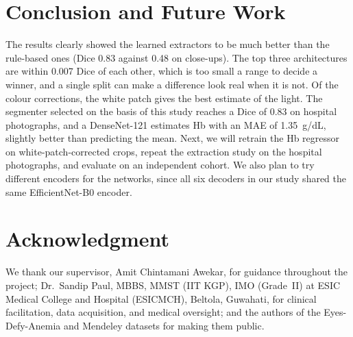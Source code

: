 \documentclass[conference]{IEEEtran}
\begin{document}
\section{Conclusion and Future Work}
The results clearly showed the learned extractors to be much better than the
rule-based ones (Dice 0.83 against 0.48 on close-ups). The top three
architectures are within 0.007 Dice of each other, which is too small a range to
decide a winner, and a single split can make a difference look real when it is
not. Of the colour corrections, the white patch gives the best estimate of the
light. The segmenter selected on the basis of this study reaches a Dice of 0.83
on hospital photographs, and a DenseNet-121 estimates Hb with an MAE of
1.35~g/dL, slightly better than predicting the mean. Next, we will retrain the
Hb regressor on white-patch-corrected crops, repeat the extraction study on the
hospital photographs, and evaluate on an independent cohort. We also plan to
try different encoders for the networks, since all six decoders in our study
shared the same EfficientNet-B0 encoder.

\section*{Acknowledgment}
We thank our supervisor, Amit Chintamani Awekar, for guidance throughout the
project; Dr.~Sandip Paul, MBBS, MMST (IIT KGP), IMO (Grade~II) at ESIC Medical
College and Hospital (ESICMCH), Beltola, Guwahati, for clinical facilitation, data
acquisition, and medical oversight;
and the authors of the Eyes-Defy-Anemia and Mendeley datasets for making them
public.



\end{document}
